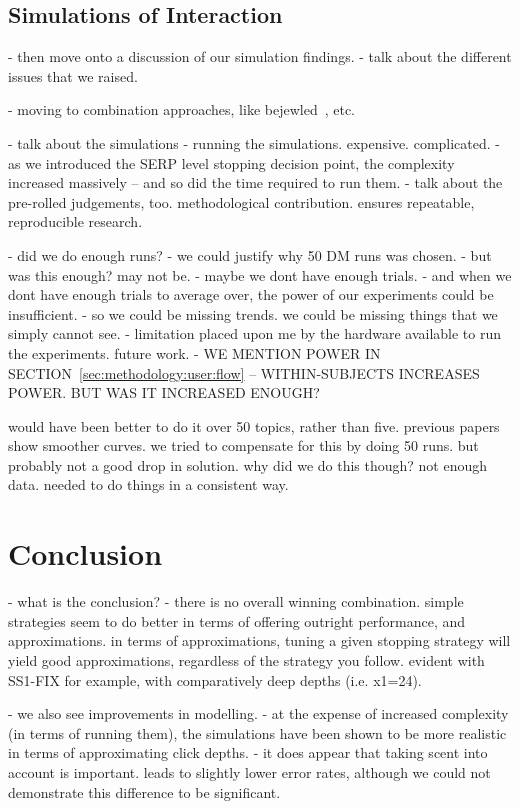 \subsection{Simulations of Interaction}

- then move onto a discussion of our simulation findings.
- talk about the different issues that we raised.

- moving to combination approaches, like bejewled~\cite{zhang2017bejewled}, etc.

- talk about the simulations
    - running the simulations. expensive. complicated.
    - as we introduced the SERP level stopping decision point, the complexity increased massively -- and so did the time required to run them.
    - talk about the pre-rolled judgements, too. methodological contribution. ensures repeatable, reproducible research.

- did we do enough runs?
    - we could justify why 50 DM runs was chosen.
    - but was this enough? may not be.
    - maybe we dont have enough trials.
    - and when we dont have enough trials to average over, the power of our experiments could be insufficient.
        - so we could be missing trends. we could be missing things that we simply cannot see.
        - limitation placed upon me by the hardware available to run the experiments. future work.
        - WE MENTION POWER IN SECTION~\ref{sec:methodology:user:flow} -- WITHIN-SUBJECTS INCREASES POWER. BUT WAS IT INCREASED ENOUGH?

would have been better to do it over 50 topics, rather than five.
previous papers show smoother curves.
we tried to compensate for this by doing 50 runs.
but probably not a good drop in solution.
why did we do this though? not enough data. needed to do things in a consistent way.


\section{Conclusion}\label{sec:conclusions:conclusion}

- what is the conclusion?
    - there is no overall winning combination. simple strategies seem to do better in terms of offering outright performance, and approximations. in terms of approximations, tuning a given stopping strategy will yield good approximations, regardless of the strategy you follow. evident with SS1-FIX for example, with comparatively deep depths (i.e. x1=24).

- we also see improvements in modelling.
- at the expense of increased complexity (in terms of running them), the simulations have been shown to be more realistic in terms of approximating click depths.
    - it does appear that taking scent into account is important. leads to slightly lower error rates, although we could not demonstrate this difference to be significant.

